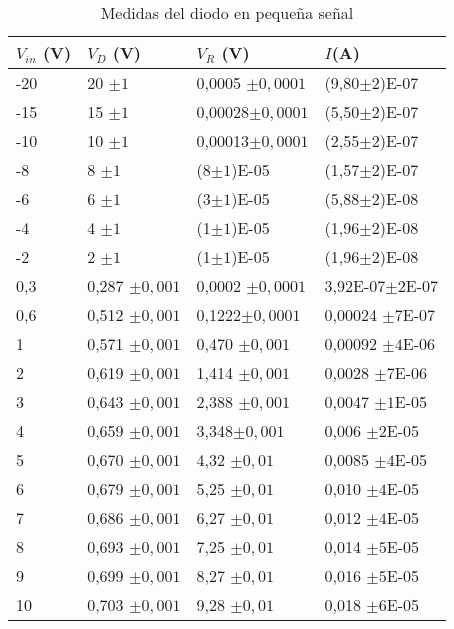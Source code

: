 \documentclass[a4paper,12pt,spanish]{article}
\begin{document}
\begin{table}[H]
	\centering
	\begin{tabular}{|l|l|l|l|}
		\hline
		$V_{in}$ (V) & $V_D$ (V) & $V_R$ (V)    & $I $(A)    \\ \hline
		-20 & 20  $\pm 1$     & 0,0005 $\pm 0,0001$ & (9,80$\pm2$)E-07 \\ \hline
		-15 & 15 $\pm 1$      & 0,00028$\pm 0,0001$ & (5,50$\pm2$)E-07 \\ \hline
		-10 & 10 $\pm 1$      & 0,00013$\pm 0,0001$ & (2,55$\pm2$)E-07 \\ \hline
		-8  & 8  $\pm 1$      & (8$\pm1$)E-05  	    & (1,57$\pm2$)E-07 \\ \hline
		-6  & 6  $\pm 1$      & (3$\pm1$)E-05       & (5,88$\pm2$)E-08 \\ \hline
		-4  & 4  $\pm 1$      & (1$\pm1$)E-05 	    & (1,96$\pm2$)E-08 \\ \hline
		-2  & 2  $\pm 1$      & (1$\pm1$)E-05	    & (1,96$\pm2$)E-08   \\ \hline
		0,3 & 0,287 $\pm 0,001$    & 0,0002 $\pm 0,0001$  & 3,92E-07$\pm2$E-07 \\ \hline
		0,6 & 0,512 $\pm 0,001$    & 0,1222$\pm 0,0001$  & 0,00024  $\pm7$E-07 \\ \hline
		1   & 0,571   $\pm 0,001$  & 0,470  $\pm 0,001$  & 0,00092  $\pm4$E-06 \\ \hline
		2   & 0,619   $\pm 0,001$  & 1,414  $\pm 0,001$ & 0,0028    $\pm7$E-06 \\ \hline
		3   & 0,643  $\pm 0,001$   & 2,388 $\pm 0,001$  & 0,0047    $\pm1$E-05 \\ \hline
		4   & 0,659  $\pm 0,001$   & 3,348$\pm 0,001$   & 0,006     $\pm2$E-05 \\ \hline
		5   & 0,670  $\pm 0,001$   & 4,32 $\pm 0,01$   & 0,0085     $\pm4$E-05 \\ \hline
		6   & 0,679 $\pm 0,001$    & 5,25 $\pm 0,01$   & 0,010      $\pm4$E-05 \\ \hline
		7   & 0,686  $\pm 0,001$   & 6,27 $\pm 0,01$   & 0,012      $\pm4$E-05  \\ \hline
		8   & 0,693 $\pm 0,001$    & 7,25 $\pm 0,01$   & 0,014      $\pm5$E-05 \\ \hline
		9   & 0,699  $\pm 0,001$   & 8,27 $\pm 0,01$   & 0,016      $\pm5$E-05\\ \hline
		10  & 0,703  $\pm 0,001$   & 9,28 $\pm 0,01$   & 0,018      $\pm6$E-05 \\ \hline
	\end{tabular}  
	\caption{Medidas del diodo en pequeña señal}
	\label{tab:my-table}
\end{table}
\end{document}
